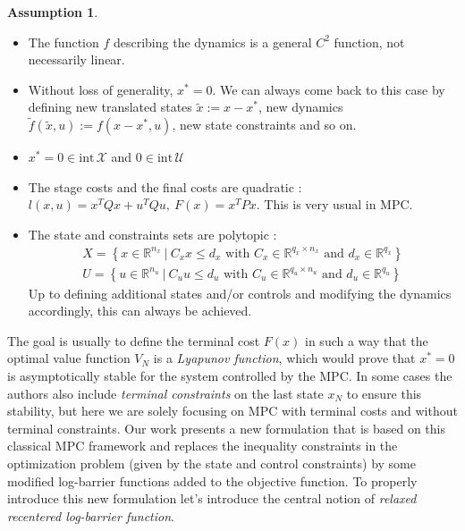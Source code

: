 \documentclass[12pt]{article}
\theoremstyle{definition}
\newtheorem{assumption}[theorem]{Assumption}
\theoremstyle{remark}
\def\cal#1{\mathcal{#1}}
\newcommand{\R}{\mathbb{R}}
\begin{document}
\begin{assumption}~
	\begin{itemize}[label=\textbullet]
		\item The function $f$ describing the dynamics is a general $C^2$ function, not necessarily linear.
		\item Without loss of generality, $x^*=0$. We can always come back to this case by defining new translated states $\tilde{x}:=x-x^*$, new dynamics $\tilde{f}(\tilde{x},u):=f(x-x^*,u)$, new state constraints and so on.
		\item $x^*=0\in\mathrm{int}\,\cal{X}$ and $0\in\mathrm{int}\,\cal{U}$
		\item The stage costs and the final costs are quadratic : $l(x,u)=x^TQx+u^TQu,~F(x)=x^TPx$.
		This is very usual in MPC.
		\item The state and constraints sets are polytopic :
		\begin{align*}
			X=\left\{x\in\R^{n_x}~|~C_xx\leq d_x\text{ with }C_x\in\R^{q_x\times n_x}\text{ and }d_x\in\R^{q_x}\right\}\\
			U=\left\{u\in\R^{n_u}~|~C_uu\leq d_u\text{ with }C_u\in\R^{q_u\times n_u}\text{ and }d_u\in\R^{q_u}\right\}
		\end{align*}
		Up to defining additional states and/or controls and modifying the dynamics accordingly, this can always be achieved.
	\end{itemize}
\end{assumption}
The goal is usually to define the terminal cost $F(x)$ in such a way that the optimal value function $V_N$ is a \textit{Lyapunov function}, which would prove that $x^*=0$ is asymptotically stable for the system controlled by the MPC.
In some cases the authors also include \textit{terminal constraints} on the last state $x_N$ to ensure this stability, but here we are solely focusing on MPC with terminal costs and without terminal constraints.
\newline
Our work presents a new formulation that is based on this classical MPC framework and replaces the inequality constraints in the optimization problem (given by the state and control constraints) by some modified log-barrier functions added to the objective function.
To properly introduce this new formulation let's introduce the central notion of \textit{relaxed recentered log-barrier function}.
\end{document}
